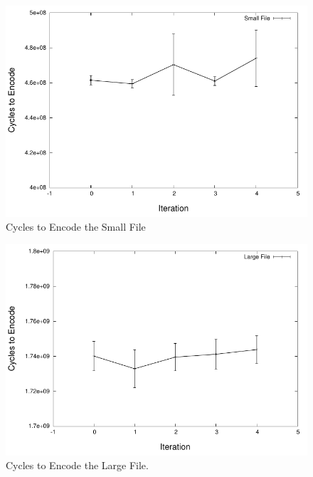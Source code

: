 \documentclass[conference]{IEEEtran}
\begin{document}
\begin{figure}[!t]
\centering
\includegraphics[scale=0.63]{images/sm_cycles.pdf}
\caption{Cycles to Encode the Small File}
\label{fig:sm_cycles}
\end{figure}

\begin{figure}[!t]
\centering
\includegraphics[scale=0.63]{images/lg_cycles.pdf}
\caption{Cycles to Encode the Large File.}
\label{fig:lg_cycles}
\end{figure}
\end{document}
